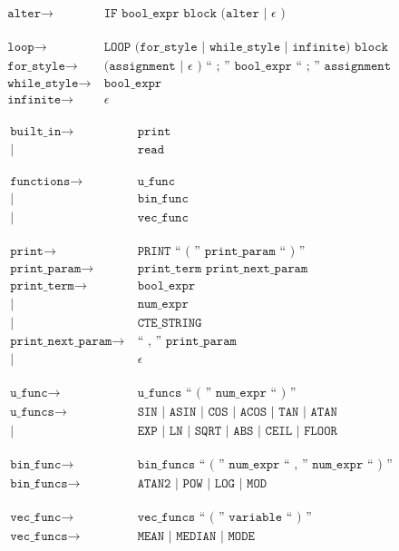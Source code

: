 \begin{align*}
	\texttt{alter}
	\rightarrow&\ \texttt{IF bool\_expr block (alter | } \epsilon \texttt{ )}\\
	\phantom{0}\\
	\texttt{loop}
	\rightarrow&\ \texttt{LOOP (for\_style | while\_style | infinite) block}\\
	\texttt{for\_style}
	\rightarrow&\ \texttt{
            (assignment | } \epsilon \texttt{ ) 
            `` ; '' bool\_expr `` ; '' assignment }\\
	\texttt{while\_style}
	\rightarrow&\ \texttt{bool\_expr}\\
	\texttt{infinite}
	\rightarrow&\ \epsilon\\
\end{align*}

\begin{align*}
	\texttt{built\_in}
	\rightarrow&\ \texttt{print}\\
            |&\ \texttt{read}\\
	\phantom{0}\\
	\texttt{functions}
	\rightarrow&\ \texttt{u\_func}\\
            |&\ \texttt{bin\_func}\\
            |&\ \texttt{vec\_func}\\
	\phantom{0}\\
	\texttt{print}
	\rightarrow&\ \texttt{PRINT `` ( '' print\_param `` ) ''}\\
	\texttt{print\_param}
	\rightarrow&\ \texttt{print\_term print\_next\_param}\\
	\texttt{print\_term}
	\rightarrow&\ \texttt{bool\_expr}\\
            |&\ \texttt{num\_expr}\\
            |&\ \texttt{CTE\_STRING}\\
	\texttt{print\_next\_param}
	\rightarrow&\ \texttt{`` , '' print\_param}\\
            |&\ \epsilon\\
	\phantom{0}\\
	\texttt{u\_func}
	\rightarrow&\ \texttt{u\_funcs `` ( '' num\_expr `` ) ''}\\
	\texttt{u\_funcs}
	\rightarrow&\ \texttt{SIN | ASIN | COS | ACOS | TAN | ATAN}\\
            |&\ \texttt{EXP | LN | SQRT | ABS | CEIL | FLOOR}\\
	\phantom{0}\\
	\texttt{bin\_func}
	\rightarrow&\ \texttt{bin\_funcs `` ( '' num\_expr `` , '' num\_expr `` ) ''}\\
	\texttt{bin\_funcs}
	\rightarrow&\ \texttt{ATAN2 | POW | LOG | MOD}\\
	\phantom{0}\\
	\texttt{vec\_func}
	\rightarrow&\ \texttt{vec\_funcs `` ( '' variable  `` ) ''}\\
	\texttt{vec\_funcs}
	\rightarrow&\ \texttt{MEAN | MEDIAN | MODE}\\
\end{align*}

